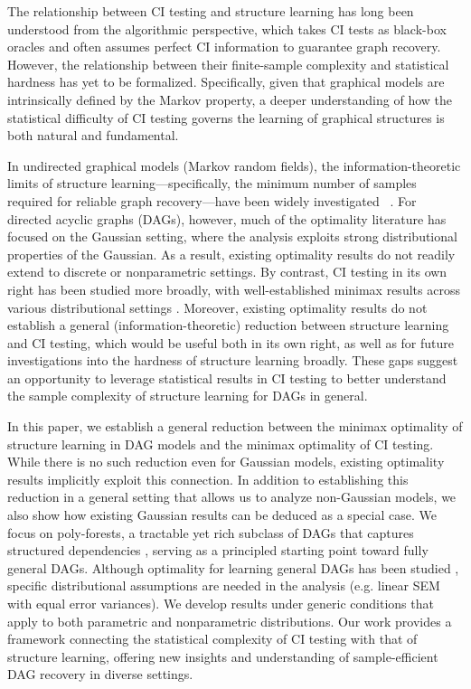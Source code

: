 \documentclass{article}
\theoremstyle{definition}
\theoremstyle{definition}
\theoremstyle{definition}
\theoremstyle{definition}
\theoremstyle{definition}
\theoremstyle{definition}
\theoremstyle{remark}
\theoremstyle{remark}
\begin{document}
The relationship between CI testing and structure learning has long been understood from the algorithmic perspective, which takes CI tests as black-box oracles and often assumes perfect CI information to guarantee graph recovery. 
However, the relationship between their finite-sample complexity and statistical hardness has yet to be formalized.
Specifically, given that graphical models are intrinsically defined by the Markov property, a deeper understanding of how the statistical difficulty of CI testing governs the learning of graphical structures is both natural and fundamental.

In undirected graphical models (Markov random fields), the information-theoretic limits of structure learning---specifically, the minimum number of samples required for reliable graph recovery---have been widely investigated ~\citep{wang2010information,drton2017structure,misra2020information}.
For directed acyclic graphs (DAGs), however, much of the optimality literature has focused on the Gaussian setting, where the analysis exploits strong distributional properties of the Gaussian. As a result, existing optimality results do not readily extend to discrete or nonparametric settings. 
By contrast, CI testing in its own right has been studied more broadly, with well-established minimax results across various distributional settings \citep{canonne2018testing,neykov2021minimax}.
Moreover, existing optimality results do not establish a general (information-theoretic) reduction between structure learning and CI testing, which would be useful both in its own right, as well as for future investigations into the hardness of structure learning broadly.
These gaps suggest an opportunity to leverage statistical results in CI testing to better understand the sample complexity of structure learning for DAGs in general.

In this paper, we establish a general reduction between the minimax optimality of structure learning in DAG models and the minimax optimality of CI testing.
While there is no such reduction even for Gaussian models, existing optimality results \citep{wang2024optimal,daskalakis2025learning} implicitly exploit this connection.
In addition to establishing this reduction in a general setting that allows us to analyze non-Gaussian models, we also show how existing Gaussian results can be deduced as a special case.
We focus on poly-forests, a tractable yet rich subclass of DAGs that captures structured dependencies \citep{chow1968approximating,dasgupta1999polytree}, serving as a principled starting point toward fully general DAGs.
Although optimality for learning general DAGs has been studied \citep{gao2022optimal}, specific distributional assumptions are needed in the analysis (e.g. linear SEM with equal error variances).
We develop results under generic conditions that apply to both parametric and nonparametric distributions. 
Our work provides a framework connecting the statistical complexity of CI testing with that of structure learning, offering new insights and understanding of sample-efficient DAG recovery in diverse settings.
\end{document}

